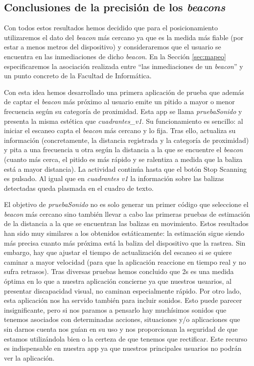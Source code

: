 \subsection{Conclusiones de la precisión de los \textit{beacons}}
\label{sub:conclusiones_posicionam}
Con todos estos resultados hemos decidido que para el posicionamiento utilizaremos el dato del \textit{beacon} más cercano ya que es la medida más fiable (por estar a menos metros del dispositivo) y consideraremos que el usuario se encuentra en las inmediaciones de dicho \textit{beacon}. En la Sección \ref{sec:mapeo} especificaremos la asociación realizada entre ``las inmediaciones de un \textit{beacon}'' y un punto concreto de la Facultad de Informática.

Con esta idea hemos desarrollado una primera aplicación de prueba que además de captar el \textit{beacon} más próximo al usuario emite un pitido a mayor o menor frecuencia según su categoría de proximidad. Esta app se llama \textit{pruebaSonido} y presenta la misma estética que \textit{cuadrantes\_v1}. Su funcionamiento es sencillo: al iniciar el escaneo capta el \textit{beacon} más cercano y lo fija. Tras ello, actualiza su información (concretamente, la distancia registrada y la categoría de proximidad) y pita a una frecuencia u otra según la distancia a la que se encuentre el \textit{beacon} (cuanto más cerca, el pitido es más rápido y se ralentiza a medida que la baliza está a mayor distancia). La actividad continúa hasta que el botón Stop Scanning es pulsado. Al igual que en \textit{cuadrantes v1} la información sobre las balizas detectadas queda plasmada en el cuadro de texto.

El objetivo de \textit{pruebaSonido} no es solo generar un primer código que seleccione el \textit{beacon} más cercano sino también llevar a cabo las primeras pruebas de estimación de la distancia a la que se encuentran las balizas en movimiento. Estos resultados han sido muy similares a los obtenidos estáticamente: la estimación sigue siendo más precisa cuanto más próxima está la baliza del dispositivo que la rastrea. Sin embargo, hay que ajustar el tiempo de actualización del escaneo si se quiere caminar a mayor velocidad (para que la aplicación reaccione en tiempo real y no sufra retrasos). Tras diversas pruebas hemos concluido que 2s es una medida óptima en lo que a nuestra aplicación concierne ya que nuestros usuarios, al presentar discapacidad visual, no caminan especialmente rápido. Por otro lado, esta aplicación nos ha servido también para incluir sonidos. Esto puede parecer insignificante, pero si nos paramos a pensarlo hay muchísimos sonidos que tenemos asociados con determinadas acciones, situaciones y/o aplicaciones que sin darnos cuenta nos guían en su uso y nos proporcionan la seguridad de que estamos utilizándola bien o la certeza de que tenemos que rectificar. Este recurso es indispensable en nuestra app ya que nuestros principales usuarios no podrán ver la aplicación.


